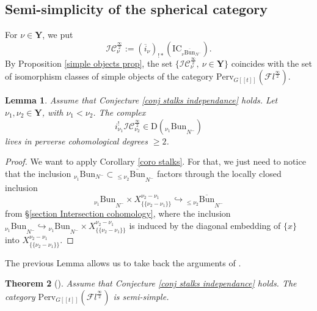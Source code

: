 \documentclass[11pt]{amsart}
\theoremstyle{plain}
\newtheorem{thm}{Theorem}[section]
\newtheorem{lem}[thm]{Lemma}
\theoremstyle{remark}
\numberwithin{equation}{section}
\begin{document}
	\subsection{Semi-simplicity of the spherical category} 
	For $\nu\in\mathbf{Y}$, we put 
 $$\mathcal{IC}^{\frac{\infty}{2}}_\nu:=(\overline{i}_\nu)_{!*}(\mathrm{IC}_{_\nu\overline{\mathrm{Bun}}_{N^-}}).$$ By Proposition \ref{simple objects prop}, the set $\{\mathcal{IC}^{\frac{\infty}{2}}_\nu,~\nu\in \mathbf{Y}\}$ coincides with the set of isomorphism classes of simple objects of the category $\mathrm{Perv}_{G[[t]]}(\mathcal{F}l^{\frac{\infty}{2}})$.
	\begin{lem}\label{lem stalks}
		Assume that Conjecture \ref{conj stalks independance} holds. Let $\nu_1,\nu_2\in\mathbf{Y}$, with $\nu_1<\nu_2$. The complex $$i^!_{\nu_1}\mathcal{IC}^{\frac{\infty}{2}}_{\nu_2}\in \mathrm{D}({_{\nu_1}\mathrm{Bun}}_{N^-})$$ 
  lives in perverse cohomological degrees $\geq2$.
		
	\end{lem}
	\begin{proof}
		We want to apply Corollary \ref{coro stalks}. For that, we just need to notice that the inclusion $_{\nu_1}\mathrm{Bun}_{N^-}\subset {_{\leq\nu_2}\overline{\mathrm{Bun}}}_{N^-}$ factors through the locally closed inclusion
		$${_{\nu_1}\mathrm{Bun}}_{N^-}\times X^{\nu_2-\nu_1}_{\{\{\nu_2-\nu_1\}\}}\hookrightarrow  {_{\leq\nu_2}\overline{\mathrm{Bun}}}_{N^-}$$
		from §\ref{section Intersection cohomology}, where the inclusion ${_{\nu_1}\mathrm{Bun}}_{N^-}\hookrightarrow{_{\nu_1}\mathrm{Bun}}_{N^-}\times X^{\nu_2-\nu_1}_{\{\{\nu_2-\nu_1\}\}}$ is induced by the diagonal embedding of $\{x\}$ into $X^{\nu_2-\nu_1}_{\{\{\nu_2-\nu_1\}\}}$.
	\end{proof}
The previous Lemma allows us to take back the arguments of \cite{ABBGM}.
	\begin{thm}[{\cite[Proposition 4.3.2]{ABBGM}}]\label{thm ss}
		Assume that Conjecture \ref{conj stalks independance} holds. The category  $\mathrm{Perv}_{G[[t]]}(\mathcal{F}l^{\frac{\infty}{2}})$ is semi-simple.
	\end{thm}
\end{document}
